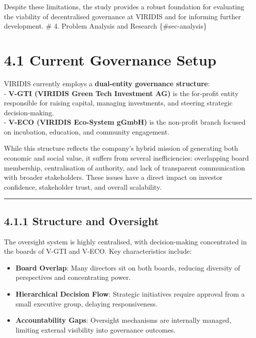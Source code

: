 \documentclass[
  english,
  12pt,
  oneside,
  open=any]{scrbook}
\providecommand{\tightlist}{%
  \setlength{\itemsep}{0pt}\setlength{\parskip}{0pt}}\usepackage{longtable,booktabs,array}
\begin{document}
Despite these limitations, the study provides a robust foundation for
evaluating the viability of decentralised governance at VIRIDIS and for
informing further development. \# 4. Problem Analysis and Research
\{\#sec-analysis\}

\section{4.1 Current Governance Setup}\label{sec-current-gov}

VIRIDIS currently employs a \textbf{dual-entity governance structure}:\\
- \textbf{V-GTI (VIRIDIS Green Tech Investment AG)} is the for-profit
entity responsible for raising capital, managing investments, and
steering strategic decision-making.\\
- \textbf{V-ECO (VIRIDIS Eco-System gGmbH)} is the non-profit branch
focused on incubation, education, and community engagement.

While this structure reflects the company's hybrid mission of generating
both economic and social value, it suffers from several inefficiencies:
overlapping board membership, centralisation of authority, and lack of
transparent communication with broader stakeholders. These issues have a
direct impact on investor confidence, stakeholder trust, and overall
scalability.

\begin{center}\rule{0.5\linewidth}{0.5pt}\end{center}

\subsection{4.1.1 Structure and Oversight}\label{sec-oversight}

The oversight system is highly centralised, with decision-making
concentrated in the boards of V-GTI and V-ECO. Key characteristics
include:

\begin{itemize}
\tightlist
\item
  \textbf{Board Overlap}: Many directors sit on both boards, reducing
  diversity of perspectives and concentrating power.\\
\item
  \textbf{Hierarchical Decision Flow}: Strategic initiatives require
  approval from a small executive group, delaying responsiveness.\\
\item
  \textbf{Accountability Gaps}: Oversight mechanisms are internally
  managed, limiting external visibility into governance outcomes.
\end{itemize}
\end{document}
